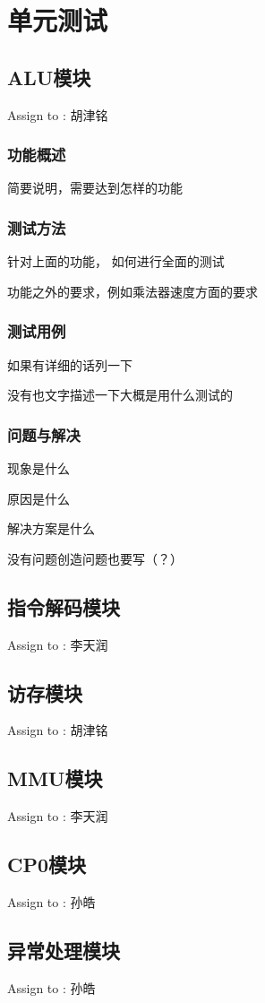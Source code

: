 \section{单元测试}


    \subsection{ALU模块}
        Assign to : 胡津铭

        \subsubsection{功能概述}
            简要说明，需要达到怎样的功能

        \subsubsection{测试方法}
            针对上面的功能，%
            如何进行全面的测试

            功能之外的要求，例如乘法器速度方面的要求

        \subsubsection{测试用例}
            如果有详细的话列一下

            没有也文字描述一下大概是用什么测试的

        \subsubsection{问题与解决}
            现象是什么

            原因是什么

            解决方案是什么

            没有问题创造问题也要写（？）


    \subsection{指令解码模块}
        Assign to : 李天润

    \subsection{访存模块}
        Assign to : 胡津铭

    \subsection{MMU模块}
        Assign to  : 李天润

    \subsection{CP0模块}
        Assign to  : 孙皓

    \subsection{异常处理模块}
        Assign to  : 孙皓
